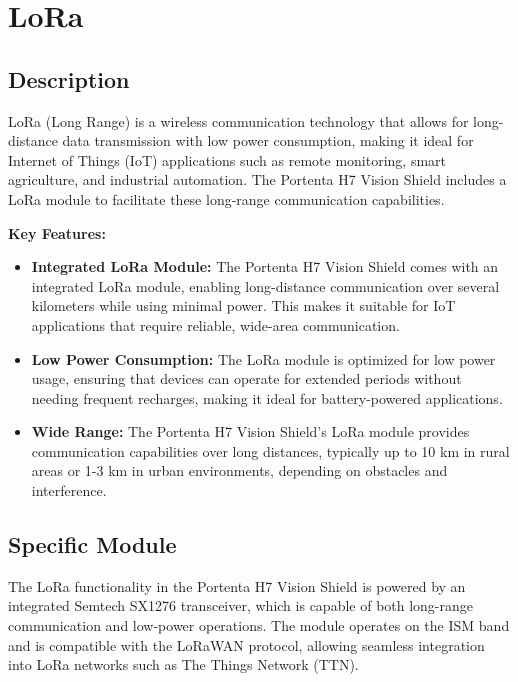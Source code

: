 \chapter{LoRa}

\section{Description}

LoRa (Long Range) is a wireless communication technology that allows for long-distance data transmission with low power consumption, making it ideal for Internet of Things (IoT) applications such as remote monitoring, smart agriculture, and industrial automation. The Portenta H7 Vision Shield includes a LoRa module to facilitate these long-range communication capabilities. \cite{connecting_to_ttn_portenta_vision_shield:2024}

\textbf{Key Features:}
\begin{itemize}
	
	\item \textbf{Integrated LoRa Module:} The Portenta H7 Vision Shield comes with an integrated LoRa module, enabling long-distance communication over several kilometers while using minimal power. This makes it suitable for IoT applications that require reliable, wide-area communication. 
	
	\item \textbf{Low Power Consumption:} The LoRa module is optimized for low power usage, ensuring that devices can operate for extended periods without needing frequent recharges, making it ideal for battery-powered applications. 
	
	\item \textbf{Wide Range:} The Portenta H7 Vision Shield’s LoRa module provides communication capabilities over long distances, typically up to 10 km in rural areas or 1-3 km in urban environments, depending on obstacles and interference.  \cite{connecting_to_ttn_portenta_vision_shield:2024}
	
\end{itemize}

\section{Specific Module}
The LoRa functionality in the Portenta H7 Vision Shield is powered by an integrated Semtech SX1276 transceiver, which is capable of both long-range communication and low-power operations. The module operates on the ISM band and is compatible with the LoRaWAN protocol, allowing seamless integration into LoRa networks such as The Things Network (TTN). \cite{connecting_to_ttn_portenta_vision_shield:2024}

